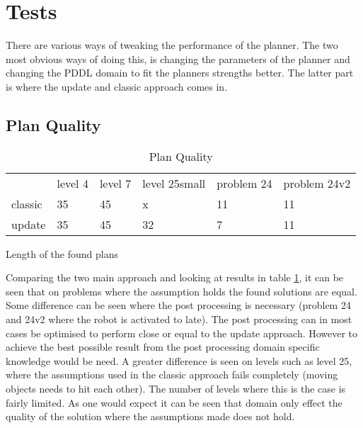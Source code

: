 \section{Tests}

%
%
%
%
%
%
%



	


	There are various ways of tweaking the performance of the planner. The two most obvious ways of doing this, is changing the parameters of the planner and changing the PDDL domain to fit the planners strengths better. The latter part is where the update and classic approach comes in.

		\subsection{Plan Quality}
			
			
						\begin{table}[h]
							\centering
							\caption{Plan Quality}
							\label{quality}
							\begin{tabular}{llllll}
								& level 4 & level 7  & level 25small & problem 24 & problem 24v2\\
								classic & 35 & 45 & x&11&11\\
								update& 35 &45& 32&7&11\\
							\end{tabular}
							Length of the found plans
						\end{table}
			
			Comparing the two main approach and looking at results in table \ref{quality}, it can be seen that on problems where the assumption holds the found solutions are equal. Some difference can be seen where the post processing is necessary (problem 24 and 24v2 where the robot is activated to late). The post processing can in most cases be optimised to perform close or equal to the update approach. However to achieve the best possible result from the post processing domain specific knowledge would be need.	A greater difference is seen on levels such as level 25, where the assumptions used in the classic approach fails completely (moving objects needs to hit each other). The number of levels where this is the case is fairly limited. As one would expect it can be seen that domain only effect the quality of the solution where the assumptions made does not hold.
			
